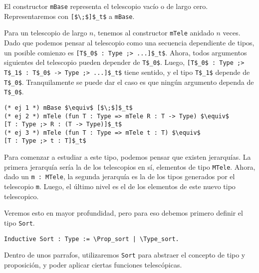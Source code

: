 El constructor \lstinline{mBase} representa el telescopio vacío o de largo cero. Representaremos con \lstinline{[$\;$]$_t$} a \lstinline{mBase}.

Para un telescopio de largo $n$, tenemos al constructor \lstinline{mTele} anidado $n$ veces. Dado que podemos pensar al telescopio como una secuencia dependiente de tipos, un posible comienzo es \lstinline{[T$_0$ : Type ;> ...]$_t$}. Ahora, todos argumentos siguientes del telescopio pueden depender de \lstinline{T$_0$}. Luego, \lstinline{[T$_0$ : Type ;> T$_1$ : T$_0$ -> Type ;> ...]$_t$} tiene sentido, y el tipo \lstinline{T$_1$} depende de \lstinline{T$_0$}. Tranquilamente se puede dar el caso es que ningún argumento dependa de \lstinline{T$_0$}.

\begin{lstlisting}[frame=tb,caption={Notación de telescopios},label=lst:not_tele]
(* ej 1 *) mBase $\equiv$ [$\;$]$_t$
(* ej 2 *) mTele (fun T : Type => mTele R : T -> Type) $\equiv$
[T : Type ;> R : (T -> Type)]$_t$
(* ej 3 *) mTele (fun T : Type => mTele t : T) $\equiv$
[T : Type ;> t : T]$_t$
\end{lstlisting}

Para comenzar a estudiar a este tipo, podemos pensar que existen jerarquías.
La primera jerarquía sería la de los telescopios en sí, elementos de tipo \lstinline{MTele}.
Ahora, dado un \lstinline{m : MTele}, la segunda jerarquía es la de los tipos generados por el telescopio \lstinline{m}.
Luego, el último nivel es el de los elementos de este nuevo tipo telescopico.

Veremos esto en mayor profundidad, pero para eso debemos primero definir el tipo \lstinline{Sort}.

\begin{lstlisting}[frame=tb,caption={Definición de \lstinline{Sort}},label=lst:Sort]
Inductive Sort : Type := \Prop_sort | \Type_sort.
\end{lstlisting}

Dentro de unos parrafos, utilizaremos \lstinline{Sort} para abstraer el concepto de tipo y proposición, y poder aplicar ciertas funciones telescópicas.

